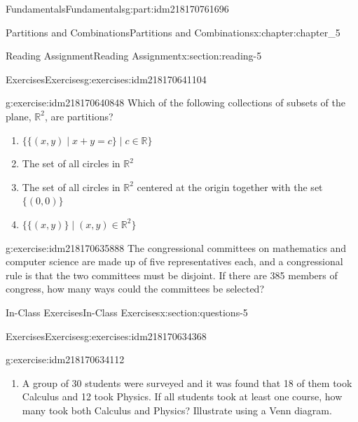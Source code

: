 \documentclass[oneside,10pt,]{book}
\numberwithin{equation}{section}
\begin{document}
\begin{partptx}{Fundamentals}{}{Fundamentals}{}{}{g:part:idm218170761696}
\begin{chapterptx}{Partitions and Combinations}{}{Partitions and Combinations}{}{}{x:chapter:chapter_5}
\begin{sectionptx}{Reading Assignment}{}{Reading Assignment}{}{}{x:section:reading-5}
\begin{exercises-subsection-numberless}{Exercises}{}{Exercises}{}{}{g:exercises:idm218170641104}
%
\begin{exercisegroup}
\begin{divisionexerciseeg}{1}{}{}{g:exercise:idm218170640848}%
Which of the following collections of subsets of the plane, \(\mathbb{R}^2\), are partitions?%
\begin{enumerate}[label=(\alph*)]
\item{}\(\displaystyle \{ \{(x, y) \mid x + y = c \} \mid c \in \mathbb{R} \}\)%
\item{}The set of all circles in \(\mathbb{R}^2 \)%
\item{}The set of all circles in \(\mathbb{R}^2\) centered at the origin together with the set \(\{(0,0)\}\)%
\item{}\(\displaystyle \{\{(x, y)\} \mid (x, y) \in \mathbb{R}^2  \} \)%
\end{enumerate}
%
\end{divisionexerciseeg}%
\begin{divisionexerciseeg}{2}{}{}{g:exercise:idm218170635888}%
The congressional committees on mathematics and computer science are made up of five representatives each, and a congressional rule is that the two committees must be disjoint. If there are 385 members of congress, how many ways could the committees be selected?%
\end{divisionexerciseeg}%
\end{exercisegroup}
\par\medskip\noindent
\end{exercises-subsection-numberless}
\end{sectionptx}
%
%
\typeout{************************************************}
\typeout{************************************************}
%
\begin{sectionptx}{In-Class Exercises}{}{In-Class Exercises}{}{}{x:section:questions-5}
%
%
%
\typeout{************************************************}
\typeout{************************************************}
%
\begin{exercises-subsection-numberless}{Exercises}{}{Exercises}{}{}{g:exercises:idm218170634368}
\par\medskip\noindent%
%
\begin{exercisegroup}
\begin{divisionexerciseeg}{1}{}{}{g:exercise:idm218170634112}%
%
\begin{enumerate}[label=(\alph*)]
\item{}A group of 30 students were surveyed and it was found that 18 of them took Calculus and 12 took Physics. If all students took at least one course, how many took both Calculus and Physics? Illustrate using a Venn diagram.%

\end{enumerate}
\end{divisionexerciseeg}
\end{exercisegroup}
\end{exercises-subsection-numberless}
\end{sectionptx}
\end{chapterptx}
\end{partptx}
\end{document}
